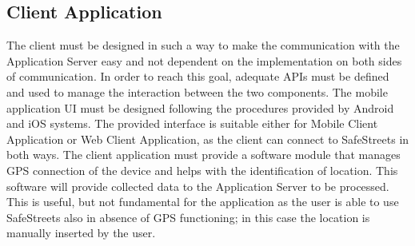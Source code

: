 \subsection{Client Application}
The client must be designed in such a way to make the communication with the Application Server easy and not dependent 
on the implementation on both sides of communication. In order to reach this goal, adequate APIs must be defined and used 
to manage the interaction between the two components. The mobile application UI must be designed following the procedures 
provided by Android and iOS systems. The provided interface is suitable either for Mobile Client Application or Web Client Application,
as the client can connect to SafeStreets in both ways.
\newline The client application must provide a software module that manages GPS connection of the device and helps with 
the identification of location. This software will provide collected data to the Application Server to be processed. This 
is useful, but not fundamental for the application as the user is able to use SafeStreets also in absence of GPS 
functioning; in this case the location is manually inserted by the user.

